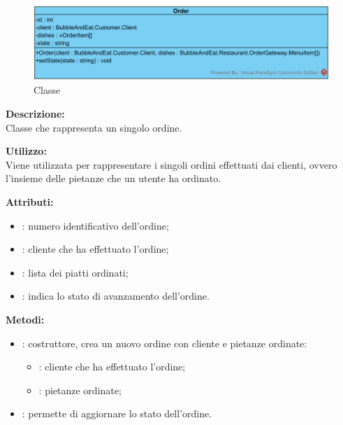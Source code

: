 \subparagraph[::Order]{\class}\mbox{}\\ \label{\class}
\begin{figure}[H]
	\centering
	\includegraphics[width=12cm]{./diagrammi/demo/server/order/order.png}
	\caption{Classe \class}
\end{figure}
\textbf{Descrizione:}\\
Classe che rappresenta un singolo ordine.

\textbf{Utilizzo:}\\
Viene utilizzata per rappresentare i singoli ordini effettuati dai clienti, ovvero l'insieme delle pietanze che un utente ha ordinato.

%

\textbf{Attributi:}
\begin{itemize}
	\item {}: numero identificativo dell'ordine;
	\item {}: cliente che ha effettuato l'ordine;
	\item {}: lista dei piatti ordinati;
	\item {}: indica lo stato di avanzamento dell'ordine.
\end{itemize}

\textbf{Metodi:}
\begin{itemize}
	\item {}: costruttore, crea un nuovo ordine con cliente e pietanze ordinate:
	\begin{itemize}
		\item {}: cliente che ha effettuato l'ordine;
		\item {}: pietanze ordinate;
	\end{itemize}
	\item {}: permette di aggiornare lo stato dell'ordine.
\end{itemize}

